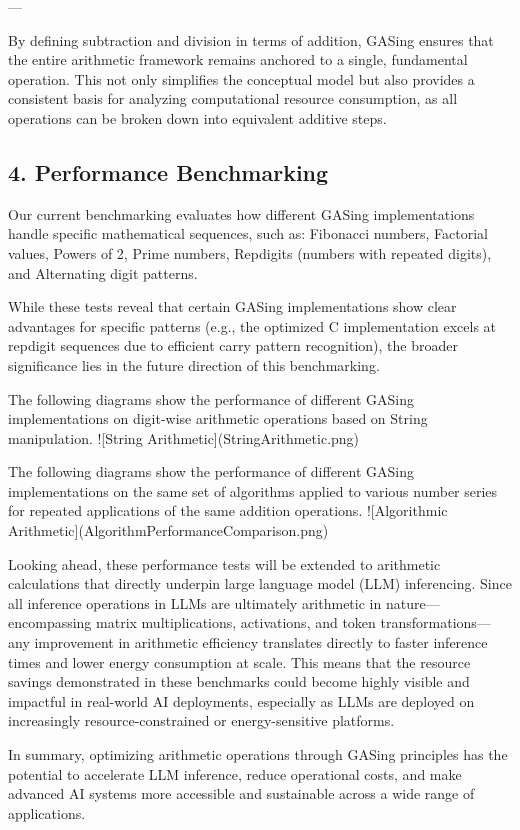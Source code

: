 \documentclass[11pt,a4paper]{article}
\begin{document}
---

By defining subtraction and division in terms of addition, GASing ensures that the entire arithmetic framework remains anchored to a single, fundamental operation. This not only simplifies the conceptual model but also provides a consistent basis for analyzing computational resource consumption, as all operations can be broken down into equivalent additive steps.

\subsection{4. Performance Benchmarking}
Our current benchmarking evaluates how different GASing implementations handle specific mathematical sequences, such as: Fibonacci numbers, Factorial values, Powers of 2, Prime numbers, Repdigits (numbers with repeated digits), and Alternating digit patterns.

While these tests reveal that certain GASing implementations show clear advantages for specific patterns (e.g., the optimized C implementation excels at repdigit sequences due to efficient carry pattern recognition), the broader significance lies in the future direction of this benchmarking.

The following diagrams show the performance of different GASing implementations on digit-wise arithmetic operations based on String manipulation.
![String Arithmetic](StringArithmetic.png)


The following diagrams show the performance of different GASing implementations on the same set of algorithms applied to various number series for repeated applications of the same addition operations.
![Algorithmic Arithmetic](AlgorithmPerformanceComparison.png)


Looking ahead, these performance tests will be extended to arithmetic calculations that directly underpin large language model (LLM) inferencing. Since all inference operations in LLMs are ultimately arithmetic in nature—encompassing matrix multiplications, activations, and token transformations—any improvement in arithmetic efficiency translates directly to faster inference times and lower energy consumption at scale. This means that the resource savings demonstrated in these benchmarks could become highly visible and impactful in real-world AI deployments, especially as LLMs are deployed on increasingly resource-constrained or energy-sensitive platforms.

In summary, optimizing arithmetic operations through GASing principles has the potential to accelerate LLM inference, reduce operational costs, and make advanced AI systems more accessible and sustainable across a wide range of applications.
\end{document}
